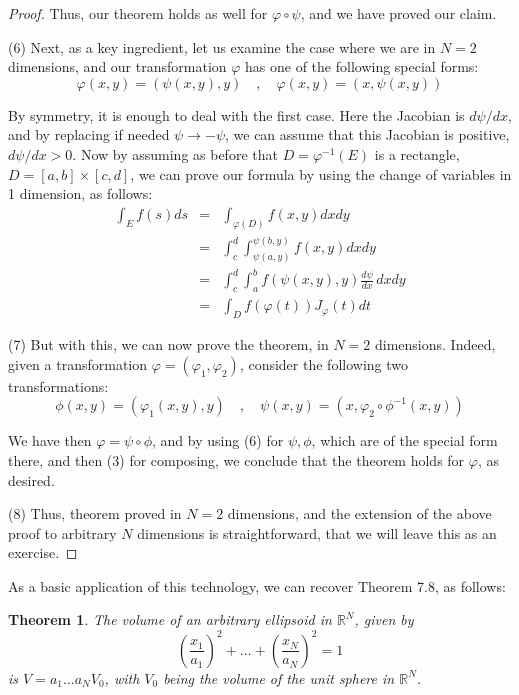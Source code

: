 \documentclass[12pt]{amsbook}
\newtheorem{theorem}{Theorem}[chapter]
\begin{document}
\begin{proof}
Thus, our theorem holds as well for $\varphi\circ\psi$, and we have proved our claim.

\medskip

(6) Next, as a key ingredient, let us examine the case where we are in $N=2$ dimensions, and our transformation $\varphi$ has one of the following special forms:
$$\varphi(x,y)=(\psi(x,y),y)\quad,\quad\varphi(x,y)=(x,\psi(x,y))$$

By symmetry, it is enough to deal with the first case. Here the Jacobian is $d\psi/dx$, and by replacing if needed $\psi\to-\psi$, we can assume that this Jacobian is positive, $d\psi/dx>0$. Now by assuming as before that $D=\varphi^{-1}(E)$ is a rectangle, $D=[a,b]\times[c,d]$, we can prove our formula by using the change of variables in 1 dimension, as follows:
\begin{eqnarray*}
\int_Ef(s)ds
&=&\int_{\varphi(D)}f(x,y)dxdy\\
&=&\int_c^d\int_{\psi(a,y)}^{\psi(b,y)}f(x,y)dxdy\\
&=&\int_c^d\int_a^bf(\psi(x,y),y)\frac{d\psi}{dx}\,dxdy\\
&=&\int_Df(\varphi(t))J_\varphi(t)dt
\end{eqnarray*}

(7) But with this, we can now prove the theorem, in $N=2$ dimensions. Indeed, given a transformation $\varphi=(\varphi_1,\varphi_2)$, consider the following two transformations:
$$\phi(x,y)=(\varphi_1(x,y),y)\quad,\quad \psi(x,y)=(x,\varphi_2\circ\phi^{-1}(x,y))$$

We have then $\varphi=\psi\circ\phi$, and by using (6) for $\psi,\phi$, which are of the special form there, and then (3) for composing, we conclude that the theorem holds for $\varphi$, as desired.

\medskip

(8) Thus, theorem proved in $N=2$ dimensions, and the extension of the above proof to arbitrary $N$ dimensions is straightforward, that we will leave this as an exercise.
\end{proof}

As a basic application of this technology, we can recover Theorem 7.8, as follows:

\begin{theorem}
The volume of an arbitrary ellipsoid in $\mathbb R^N$, given by
$$\left(\frac{x_1}{a_1}\right)^2+\ldots+\left(\frac{x_N}{a_N}\right)^2=1$$
is $V=a_1\ldots a_NV_0$, with $V_0$ being the volume of the unit sphere in $\mathbb R^N$.
\end{theorem}
\end{document}
